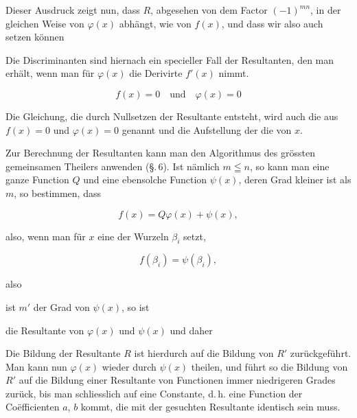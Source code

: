 
Dieser Ausdruck zeigt nun, dass $R$, abgesehen von dem
Factor $(-1)^{mn}$, in der gleichen Weise von $\varphi(x)$ abhängt, wie
von $f(x)$, und dass wir also auch setzen können


Die Discriminanten sind hiernach ein specieller Fall der
Resultanten, den man erhält, wenn man für $\varphi(x)$ die Derivirte
$f'(x)$ nimmt.


\[ f(x) = 0 \quad \text{und} \quad \varphi(x) = 0 \]


Die Gleichung, die durch Nullsetzen der Resultante entsteht,
wird auch die  aus $f(x) = 0$ und $\varphi(x) = 0$
genannt und die Aufstellung der  die 
von $x$.

Zur Berechnung der Resultanten kann man den Algorithmus
des grössten gemeinsamen Theilers anwenden (\S.\,6). Ist nämlich
$m \leqq n$, so kann man eine ganze Function $Q$ und eine ebensolche
Function $\psi(x)$, deren Grad kleiner ist als $m$, so bestimmen,
dass

\[ f(x) = Q\varphi(x) + \psi(x), \]

also, wenn man für $x$ eine der Wurzeln $\beta_i$ setzt,

\[ f(\beta_i) = \psi(\beta_i), \]

also


ist $m'$ der Grad von $\psi(x)$, so ist


die Resultante von $\varphi(x)$ und $\psi(x)$ und daher


Die Bildung der Resultante $R$ ist hierdurch auf die Bildung
von $R'$ zurückgeführt. Man kann nun $\varphi(x)$ wieder durch $\psi(x)$
theilen, und führt so die Bildung von $R'$ auf die Bildung einer
Resultante von Functionen immer niedrigeren Grades zurück, bis
man schliesslich auf eine Constante, d.\,h. eine Function der
Coëfficienten $a$, $b$ kommt, die mit der gesuchten Resultante identisch
sein muss.

